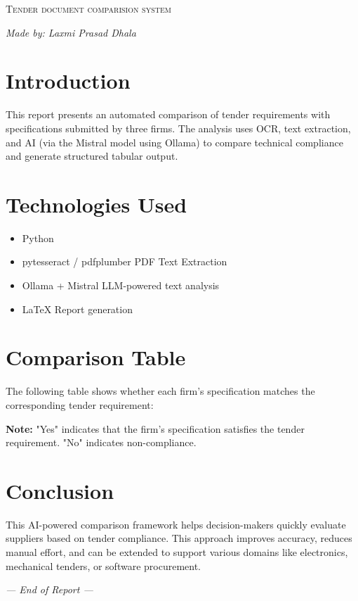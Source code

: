 \documentclass[12pt]{article}
\begin{document}
\begin{titlepage}
    \centering
    {\scshape\LARGE Tender document comparision system \par}
    \vspace{1cm}

    {\Large\itshape Made by: Laxmi Prasad Dhala \par}
    \vfill
\end{titlepage}



\section*{Introduction}
This report presents an automated comparison of tender requirements with specifications submitted by three firms. The analysis uses OCR, text extraction, and AI (via the Mistral model using Ollama) to compare technical compliance and generate structured tabular output.

\section*{Technologies Used}
\begin{itemize}
    \item Python
    \item pytesseract / pdfplumber \textendash PDF Text Extraction
    \item Ollama + Mistral \textendash LLM-powered text analysis
    \item LaTeX \textendash Report generation
\end{itemize}

\section*{Comparison Table}
\noindent The following table shows whether each firm's specification matches the corresponding tender requirement:

% 

\vspace{1cm}
\textbf{Note:} "Yes" indicates that the firm's specification satisfies the tender requirement. "No" indicates non-compliance.

\section*{Conclusion}
This AI-powered comparison framework helps decision-makers quickly evaluate suppliers based on tender compliance. This approach improves accuracy, reduces manual effort, and can be extended to support various domains like electronics, mechanical tenders, or software procurement.

\vfill
\begin{center}
    \textit{--- End of Report ---}
\end{center}
\end{document}
